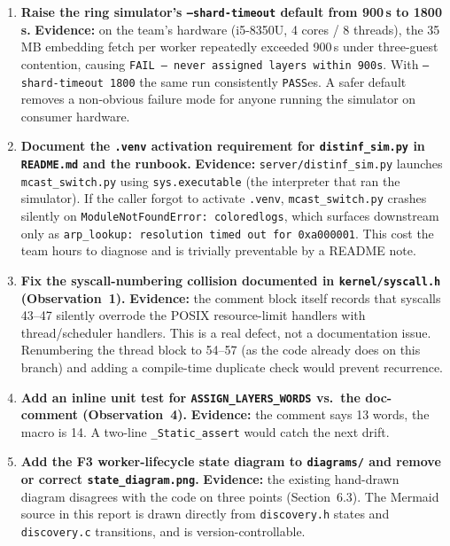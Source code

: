 \documentclass[11pt,a4paper]{article}
\begin{document}
\begin{enumerate}[leftmargin=*]
\item \textbf{Raise the ring simulator's \texttt{--shard-timeout} default from 900\,s to 1800\,s.}
\textbf{Evidence:} on the team's hardware (i5-8350U, 4 cores / 8 threads), the 35\,MB embedding fetch per worker repeatedly exceeded 900\,s under three-guest contention, causing \texttt{FAIL -- never assigned layers within 900s}. With \texttt{--shard-timeout 1800} the same run consistently \texttt{PASS}es. A safer default removes a non-obvious failure mode for anyone running the simulator on consumer hardware.

\item \textbf{Document the \texttt{.venv} activation requirement for \texttt{distinf\_sim.py} in \texttt{README.md} and the runbook.}
\textbf{Evidence:} \texttt{server/distinf\_sim.py} launches \texttt{mcast\_switch.py} using \texttt{sys.executable} (the interpreter that ran the simulator). If the caller forgot to activate \texttt{.venv}, \texttt{mcast\_switch.py} crashes silently on \texttt{ModuleNotFoundError: coloredlogs}, which surfaces downstream only as \texttt{arp\_lookup: resolution timed out for 0xa000001}. This cost the team hours to diagnose and is trivially preventable by a README note.

\item \textbf{Fix the syscall-numbering collision documented in \texttt{kernel/syscall.h} (Observation~1).}
\textbf{Evidence:} the comment block itself records that syscalls 43--47 silently overrode the POSIX resource-limit handlers with thread/scheduler handlers. This is a real defect, not a documentation issue. Renumbering the thread block to 54--57 (as the code already does on this branch) and adding a compile-time duplicate check would prevent recurrence.

\item \textbf{Add an inline unit test for \texttt{ASSIGN\_LAYERS\_WORDS} vs.\ the doc-comment (Observation~4).}
\textbf{Evidence:} the comment says 13 words, the macro is 14. A two-line \texttt{\_Static\_assert} would catch the next drift.

\item \textbf{Add the F3 worker-lifecycle state diagram to \texttt{diagrams/} and remove or correct \texttt{state\_diagram.png}.}
\textbf{Evidence:} the existing hand-drawn diagram disagrees with the code on three points (Section~6.3). The Mermaid source in this report is drawn directly from \texttt{discovery.h} states and \texttt{discovery.c} transitions, and is version-controllable.
\end{enumerate}
\end{document}
